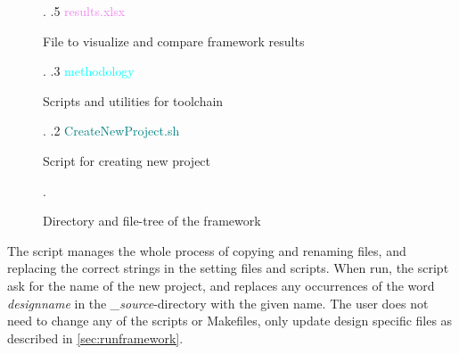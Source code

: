 \begin{figure}
\begin{minipage}{0.99\textwidth}
{\begin{minipage}[t]{5.4cm}
                                                            \end{minipage}. 
    .5 \textcolor{violet}{results{.}xlsx} \dotfill \:\:\begin{minipage}[t]{5.4cm}
                                                            File to visualize and compare framework results
                                                            \end{minipage}. 
    .3 \textcolor{cyan}{methodology} \dotfill \:\:\begin{minipage}[t]{5.4cm}
                                                            Scripts and utilities for toolchain
                                                            \end{minipage}. 
    .2 \textcolor{teal}{CreateNewProject{.}sh} \dotfill \:\:\begin{minipage}[t]{5.4cm}
                                                            Script for creating new project
                                                            \end{minipage}. 
    }
\end{minipage}
\caption{Directory and file-tree of the framework}
\label{fig:frameworkdirtree}
\end{figure}
The script manages the whole process of copying and renaming files, and replacing the correct strings in the setting files and scripts. When run, the script ask for the name of the new project, and replaces any occurrences of the word \textit{designname} in the \textit{\_source}-directory with the given name. The user does not need to change any of the scripts or Makefiles, only update design specific files as described in \cref{sec:runframework}.

